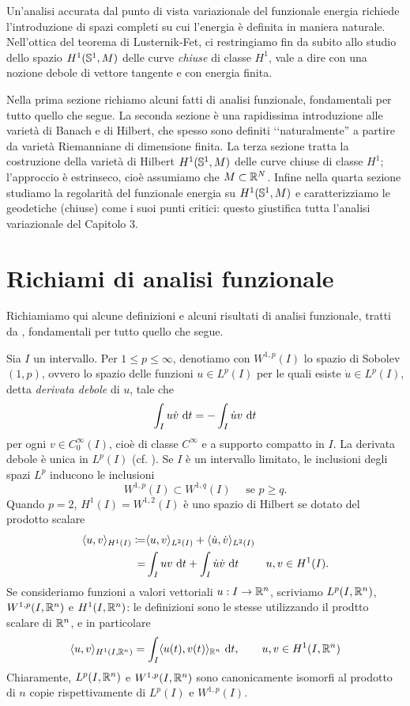 
	Un'analisi accurata dal punto di vista variazionale del funzionale energia richiede l'introduzione di spazi completi su cui l'energia è definita in maniera naturale. Nell'ottica del teorema di Lusternik-Fet, ci restringiamo fin da subito allo studio dello spazio \(H^1(\mathbb{S}^1,M)\) delle curve \textit{chiuse} di classe \(H^1\), vale a dire con una nozione debole di vettore tangente e con energia finita.
	
	Nella prima sezione richiamo alcuni fatti di analisi funzionale, fondamentali per tutto quello che segue. La seconda sezione è una rapidissima introduzione alle varietà di Banach e di Hilbert, che spesso sono definiti ‘‘naturalmente'' a partire da varietà Riemanniane di dimensione finita. La terza sezione tratta la costruzione della varietà di Hilbert \(H^1(\mathbb{S}^1,M)\) delle curve chiuse di classe \(H^1\); l'approccio è estrinseco, cioè assumiamo che \(M \subset \mathbb{R}^N\). Infine nella quarta sezione studiamo la regolarità del funzionale energia su \(H^1(\mathbb{S}^1,M)\) e caratterizziamo le geodetiche (chiuse) come i suoi punti critici: questo giustifica tutta l'analisi variazionale del Capitolo 3.

\section{Richiami di analisi funzionale}

Richiamiamo qui alcune definizioni e alcuni risultati di analisi funzionale, tratti da \cite{brezis2011functional}, fondamentali per tutto quello che segue. 

Sia \(I\) un intervallo. Per \(1 \leq p \leq \infty\), denotiamo con \(W^{1,p}(I)\) lo spazio di Sobolev \((1,p)\), ovvero lo spazio delle funzioni \(u \in L^p(I)\) per le quali esiste \(\dot u \in L^p(I)\), detta \textit{derivata debole} di \(u\), tale che
\[
\int_I u\dot v \ \mathrm{d} t = - \int_I \dot u v \ \mathrm{d} t
\]
per ogni \(v \in C_0^\infty(I)\), cioè di classe \(C^\infty\) e a supporto compatto in \(I\). La derivata debole è unica in \(L^p(I)\) (cf. \cite[p. 203 Remark 3]{brezis2011functional}). Se \(I\) è un intervallo limitato, le inclusioni degli spazi \(L^p\) inducono le inclusioni
\[
	W^{1,p}(I) \subset W^{1,q}(I) \quad  \text{ se }p \geq q.
\]
Quando \(p = 2\), \(H^1(I) = W^{1,2}(I)\) è uno spazio di Hilbert se dotato del prodotto scalare
\begin{align*}
	\langle u,v \rangle_{H^1(I)} \coloneq & \langle u,v \rangle_{L^2(I)} + \langle \dot u, \dot v \rangle_{L^2(I)} &\\
	= & \int_I uv \ \mathrm{d} t + \int_I \dot u \dot v \ \mathrm{d} t  & u,v \in H^1(I).
\end{align*}
Se consideriamo funzioni a valori vettoriali \(u: I \to \mathbb{R}^n\), scriviamo \(L^p(I,\mathbb{R}^n)\), \(W^{1,p}(I,\mathbb{R}^n)\) e \(H^1(I,\mathbb{R}^n)\): le definizioni sono le stesse utilizzando il prodtto scalare di \(\mathbb{R}^n\), e in particolare
\[
\langle u, v \rangle_{H^1(I,\mathbb{R}^n)} = \int_I \langle u(t),v(t)\rangle_{\mathbb{R}^n} \ \mathrm{d} t, \qquad u,v \in H^1(I,\mathbb{R}^n)
\]
Chiaramente, \(L^p(I,\mathbb{R}^n)\) e \(W^{1,p}(I,\mathbb{R}^n)\) sono canonicamente isomorfi al prodotto di \(n\) copie rispettivamente di \(L^p(I)\) e \(W^{1,p}(I)\).

